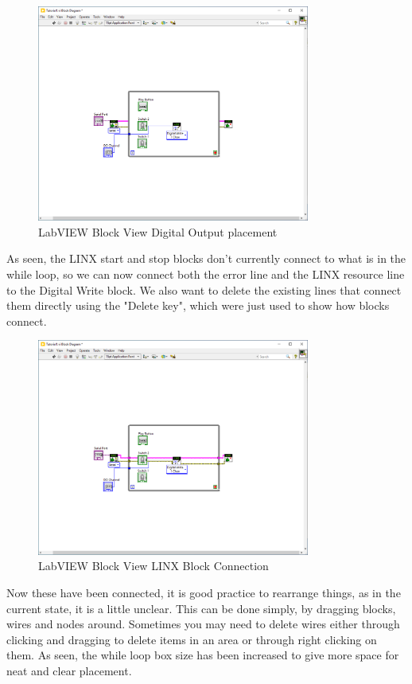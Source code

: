 \documentclass[a4paper,11pt]{report}
\begin{document}
\begin{figure}[H]
\centering
\includegraphics[width=0.8\textwidth]{screenshots/labview21}
\caption{LabVIEW Block View Digital Output placement}
\end{figure}

As seen, the LINX start and stop blocks don't currently connect to what is in the while loop, so we can now connect both the error line and the LINX resource line to the Digital Write block. We also want to delete the existing lines that connect them directly using the "Delete key", which were just used to show how blocks connect.

\begin{figure}[H]
\centering
\includegraphics[width=0.8\textwidth]{screenshots/labview22}
\caption{LabVIEW Block View LINX Block Connection}
\end{figure}

Now these have been connected, it is good practice to rearrange things, as in the current state, it is a little unclear. This can be done simply, by dragging blocks, wires and nodes around. Sometimes you may need to delete wires either through clicking and dragging to delete items in an area or through right clicking on them. As seen, the while loop box size has been increased to give more space for neat and clear placement.
\end{document}
